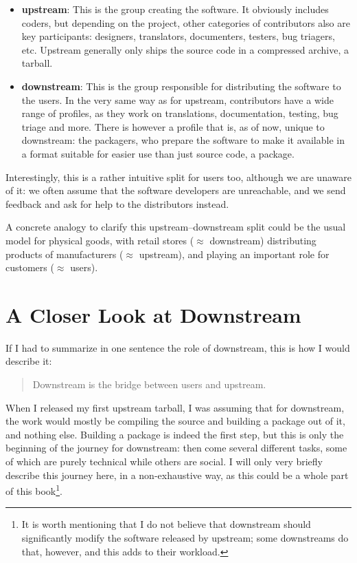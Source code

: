 \begin{itemize}
\item \textbf{upstream}: This is the group creating the software. It obviously
includes coders, but depending on the project, other categories of contributors
also are key participants: designers, translators, documenters, testers, bug
triagers, etc. Upstream generally only ships the source code in a compressed
archive, a tarball.
\item \textbf{downstream}: This is the group responsible for distributing the
software to the users. In the very same way as for upstream, contributors have
a wide range of profiles, as they work on translations, documentation, testing,
bug triage and more. There is however a profile that is, as of now, unique to
downstream: the packagers, who prepare the software to make it available in a
format suitable for easier use than just source code, a package.
\end{itemize}

Interestingly, this is a rather intuitive split for users too, although we are
unaware of it: we often assume that the software developers are unreachable,
and we send feedback and ask for help to the distributors instead.

A concrete analogy to clarify this upstream--downstream split could be the
usual model for physical goods, with retail stores ($\approx$ downstream)
distributing products of manufacturers ($\approx$ upstream), and playing an
important role for customers ($\approx$ users).

\section*{A Closer Look at Downstream}

If I had to summarize in one sentence the role of downstream, this is how I
would describe it:
\begin{quote}
Downstream is the bridge between users and upstream.
\end{quote}

When I released my first upstream tarball, I was assuming that for downstream,
the work would mostly be compiling the source and building a package out of it,
and nothing else. Building a package is indeed the first step, but this is only
the beginning of the journey for downstream: then come several different tasks,
some of which are purely technical while others are social. I will only very
briefly describe this journey here, in a non-exhaustive way, as this could be a
whole part of this book\footnote{It is worth mentioning that I do not believe
that downstream should significantly modify the software released by upstream;
some downstreams do that, however, and this adds to their workload.}.

